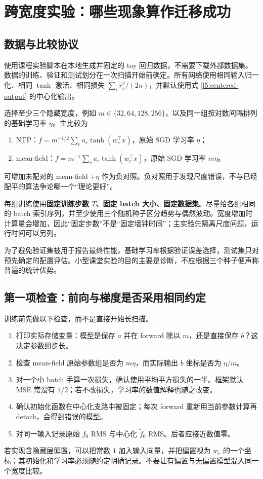 \section{跨宽度实验：哪些现象算作迁移成功}
\label{l5:lab}

\subsection{数据与比较协议}

使用课程实验脚本在本地生成并固定的 toy 回归数据，不需要下载外部数据集。数据的训练、验证和测试划分在一次扫描开始前确定。所有网络使用相同输入归一化、相同 $\tanh$ 激活、相同损失 $\sum_i r_i^2/(2n)$，并默认使用式 \eqref{l5:centered-output} 的中心化输出。

选择至少三个隐藏宽度，例如 $m\in\{32,64,128,256\}$，以及同一组按对数间隔排列的基础学习率 $\eta$。主比较为
\begin{enumerate}
 \item NTP：$f=m^{-1/2}\sum_r a_r\tanh(w_r^\top x)$，原始 SGD 学习率 $\eta$；
 \item mean-field：$f=m^{-1}\sum_r a_r\tanh(w_r^\top x)$，原始 SGD 学习率 $m\eta$。
\end{enumerate}
可增加未配对的 mean-field $+\eta$ 作为负对照。负对照用于发现尺度错误，不与已经配平的算法争论哪一个“理论更好”。

每组训练使用\textbf{固定训练步数 $T$、固定 batch 大小、固定数据集}。尽量给各组相同的 batch 索引序列，并至少使用三个随机种子区分趋势与偶然波动。宽度增加时计算量会增加，因此“固定步数”不是“固定墙钟时间”；主实验先隔离尺度问题，运行时间可以另列。

为了避免验证集被用于报告最终性能，基础学习率根据验证误差选择，测试集只对预先确定的配置评估。小型课堂实验的目的主要是诊断，不应根据三个种子便声称普遍的统计优势。

\subsection{第一项检查：前向与梯度是否采用相同约定}

训练前先做以下检查，而不是直接开始长扫描。
\begin{enumerate}
 \item 打印实际存储变量：模型是保存 $a$ 并在 forward 除以 $m$，还是直接保存 $b$？这决定参数组步长。
 \item 检查 mean-field 原始参数组是否为 $m\eta$，而实际输出 $b$ 坐标是否为 $\eta/m$。
 \item 对一个小 batch 手算一次损失，确认使用平均平方损失的一半。框架默认 MSE 常没有 $1/2$；若不改损失，学习率的数值解释也随之改变。
 \item 确认初始化函数在中心化支路中被固定；每次 forward 重新用当前参数计算再 detach，会得到错误的模型。
 \item 对同一输入记录原始 $f_0$ RMS 与中心化 $\widetilde f_0$ RMS。后者应接近数值零。
\end{enumerate}
若实现含隐藏层偏置，可以把常数 $1$ 加入输入向量，并把偏置视为 $w_r$ 的一个坐标；其初始化和学习率必须随约定明确记录。不要让有偏置与无偏置模型混入同一个宽度比较。

